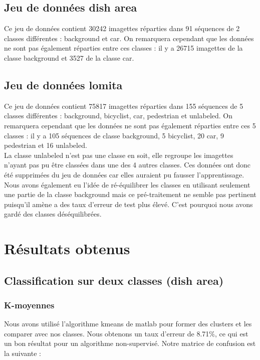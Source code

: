 \subsection{Jeu de données dish area}

	Ce jeu de données contient 30242 imagettes réparties dans 91 séquences de 2 classes différentes : background et car.  On remarquera cependant que les données ne sont pas également réparties entre ces classes : il y a 26715 imagettes de la classe background et 3527 de la classe car.

\subsection{Jeu de données lomita}

	Ce jeu de données contient 75817 imagettes réparties dans 155 séquences de 5 classes différentes : background, bicyclist, car, pedestrian et unlabeled. On remarquera cependant que les données ne sont pas également réparties entre ces 5 classes : il y a 105 séquences de classe background, 5 bicyclist, 20 car, 9 pedestrian et 16 unlabeled. \\

	La classe unlabeled n'est pas une classe en soit, elle regroupe les imagettes n'ayant pas pu être classées dans une des 4 autres classes. Ces données ont donc été supprimées du jeu de données car elles auraient pu fausser l'apprentissage. \\

	Nous avons également eu l'idée de ré-équilibrer les classes en utilisant seulement une partie de la classe background mais ce pré-traitement ne semble pas pertinent puisqu'il amène a des taux d'erreur de test plus élevé. C'est pourquoi nous avons gardé des classes déséquilibrées. \\


\section{Résultats obtenus}


	\subsection{Classification sur deux classes (dish area)}
		\subsubsection{K-moyennes}
			Nous avons utilisé l'algorithme kmeans de matlab pour former des clusters et les comparer avec nos classes. Nous obtenons un taux d'erreur de 8.71\%, ce qui est un bon résultat pour un algorithme non-supervisé. Notre matrice de confusion est la suivante : 

